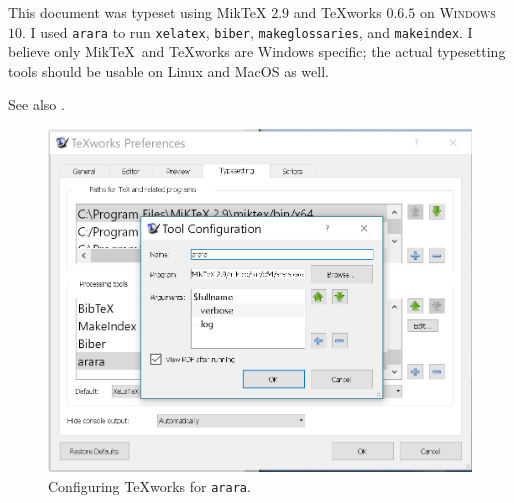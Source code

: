 
This document was typeset using Mik\TeX{} $2.9$ \cite{Miktex2017} 
and {\TeX}works $0.6.5$ \cite{Texworks2017} 
on \textsc{Windows} $10$. 
I used \texttt{arara} \cite{arara2017} 
to run \texttt{xelatex}, \texttt{biber}, \texttt{makeglossaries},  and
\texttt{makeindex}.
I believe only Mik\TeX\  and {\TeX}works are Windows specific; 
the actual typesetting tools should be usable on Linux and MacOS as well.

See also \cite{talbot2012,talbot2013}.

\begin{figure}[htbp]
\centering
\includegraphics[scale=0.5]{../figs/arara.png}
\caption{Configuring {\TeX}works for \texttt{arara}.}
\label{fig:arara}
\end{figure}
\vfill